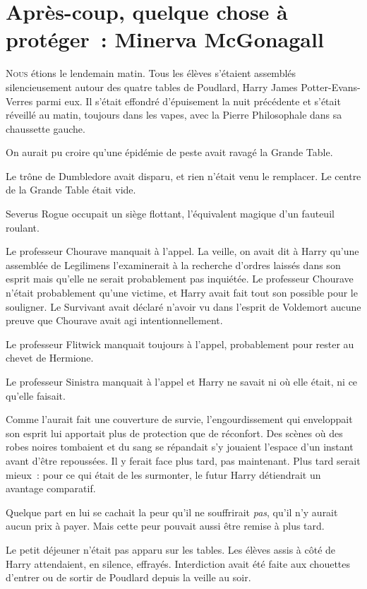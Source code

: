 \chapter{Après-coup, quelque chose à protéger~: Minerva McGonagall}

\lettrine{N}{ous} étions le lendemain matin.
Tous les élèves s'étaient assemblés silencieusement autour des quatre tables de Poudlard, Harry James Potter-Evans-Verres parmi eux.
Il s'était effondré d'épuisement la nuit précédente et s'était réveillé au matin, toujours dans les vapes, avec la Pierre Philosophale dans sa chaussette gauche.

On aurait pu croire qu'une épidémie de peste avait ravagé la Grande Table.

Le trône de Dumbledore avait disparu, et rien n'était venu le remplacer.
Le centre de la Grande Table était vide.

Severus Rogue occupait un siège flottant, l'équivalent magique d'un fauteuil roulant.

Le professeur Chourave manquait à l'appel.
La veille, on avait dit à Harry qu'une assemblée de Legilimens l'examinerait à la recherche d'ordres laissés dans son esprit mais qu'elle ne serait probablement pas inquiétée.
Le professeur Chourave n'était probablement qu'une victime, et Harry avait fait tout son possible pour le souligner.
Le Survivant avait déclaré n'avoir vu dans l'esprit de Voldemort aucune preuve que Chourave avait agi intentionnellement.

Le professeur Flitwick manquait toujours à l'appel, probablement pour rester au chevet de Hermione.

Le professeur Sinistra manquait à l'appel et Harry ne savait ni où elle était, ni ce qu'elle faisait.

Comme l'aurait fait une couverture de survie, l'engourdissement qui enveloppait son esprit lui apportait plus de protection que de réconfort.
Des scènes où des robes noires tombaient et du sang se répandait s'y jouaient l'espace d'un instant avant d'être repoussées.
Il y ferait face plus tard, pas maintenant.
Plus tard serait mieux~: pour ce qui était de les surmonter, le futur Harry détiendrait un avantage comparatif.

Quelque part en lui se cachait la peur qu'il ne souffrirait \emph{pas}, qu'il n'y aurait aucun prix à payer.
Mais cette peur pouvait aussi être remise à plus tard.

Le petit déjeuner n'était pas apparu sur les tables.
Les élèves assis à côté de Harry attendaient, en silence, effrayés.
Interdiction avait été faite aux chouettes d'entrer ou de sortir de Poudlard depuis la veille au soir.

